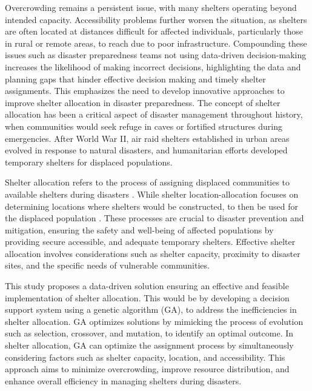 \documentclass[11pt,letterpaper,]{article}
\begin{document}
	Overcrowding remains a persistent issue, with many shelters operating beyond intended capacity. Accessibility problems further worsen the situation, as shelters are often located at distances difficult for affected individuals, particularly those in rural or remote areas, to reach due to poor infrastructure. Compounding these issues such as disaster preparedness teams not using data-driven decision-making increases the likelihood of making incorrect decisions, highlighting the data and planning gaps that hinder effective decision making and timely shelter assignments. This emphasizes the need to develop innovative approaches to improve shelter allocation in disaster preparedness.
	The concept of shelter allocation has been a critical aspect of disaster management throughout history, when communities would seek refuge in caves or fortified structures during emergencies. After World War II, air raid shelters established in urban areas evolved in response to natural disasters, and humanitarian efforts developed temporary shelters for displaced populations.
	
	Shelter allocation refers to the process of assigning displaced communities to available shelters during disasters \parencite{Yin2023}. While shelter location-allocation focuses on determining locations where shelters would be constructed, to then be used for the displaced population \parencite{Xiujuan2019}. These processes are crucial to disaster prevention and mitigation, ensuring the safety and well-being of affected populations by providing secure accessible, and adequate temporary shelters. Effective shelter allocation involves considerations such as shelter capacity, proximity to disaster sites, and the specific needs of vulnerable communities.
	
	This study proposes a data-driven solution ensuring an effective and feasible implementation of shelter allocation. This would be by developing a decision support system using a genetic algorithm (GA), to address the inefficiencies in shelter allocation. GA optimizes solutions by mimicking the process of evolution such as selection, crossover, and mutation, to identify an optimal outcome. In shelter allocation, GA can optimize the assignment process by simultaneously considering factors such as shelter capacity, location, and accessibility. This approach aims to minimize overcrowding, improve resource distribution, and enhance overall efficiency in managing shelters during disasters.
	
\end{document}
